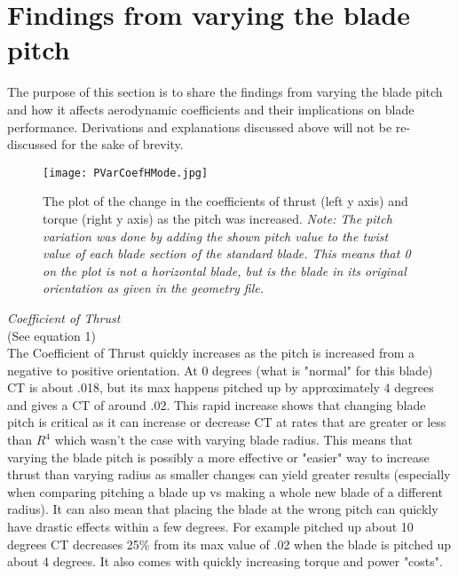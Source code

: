 \documentclass[12pt]{texmemo} %
\begin{document}
\vspace{5mm} %

\section{Findings from varying the blade pitch}

The purpose of this section is to share the findings from varying the blade pitch and how it affects aerodynamic coefficients and their implications on blade performance. Derivations and explanations discussed above will not be re-discussed for the sake of brevity.

\vspace{5mm} %

\begin{figure}[h]
\centering
\texttt{[image: PVarCoefHMode.jpg]}
\caption{The plot of the change in the coefficients of thrust (left y axis) and torque (right y axis) as the pitch was increased. \textit{Note: The pitch variation was done by adding the shown pitch value to the twist value of each blade section of the standard blade. This means that 0 on the plot is not a horizontal blade, but is the blade in its original orientation as given in the geometry file.}}
\end{figure}

\textit{Coefficient of Thrust}\\
(See equation 1)\\
The Coefficient of Thrust quickly increases as the pitch is increased from a negative to positive orientation. At 0 degrees (what is "normal" for this blade) CT is about .018, but its max happens pitched up by approximately 4 degrees and gives a CT of around .02. This rapid increase shows that changing blade pitch is critical as it can increase or decrease CT at rates that are greater or less than $R^4$ which wasn't the case with varying blade radius. This means that varying the blade pitch is possibly a more effective or "easier" way to increase thrust than varying radius as smaller changes can yield greater results (especially when comparing pitching a blade up vs making a whole new blade of a different radius). It can also mean that placing the blade at the wrong pitch can quickly have drastic effects within a few degrees. For example pitched up about 10 degrees CT decreases 25\% from its max value of .02 when the blade is pitched up about 4 degrees. It also comes with quickly increasing torque and power "costs".
\end{document}
